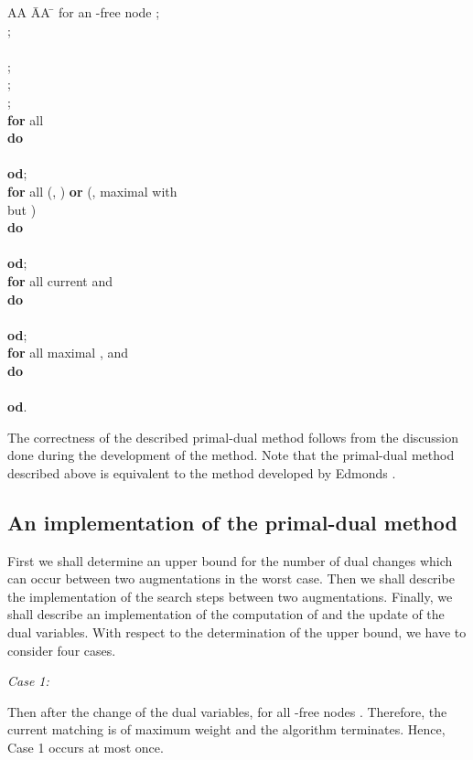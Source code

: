 \documentclass[12pt,twoside,a4paper]{article}
\begin{document}
\begin{tabbing}
AA \= AA \= \kill
 for an -free node ; \\
;\\
   \\
 ; \\
; \\
; \\
{\bf for} all  \\
\> {\bf do} \\
\> \>  \\
\> {\bf od}; \\ 
{\bf for} all (, ) {\bf or} (,  
maximal with \\
\> \> \qquad \qquad \qquad \qquad \qquad \qquad  but ) \\
\> {\bf do} \\
\> \>  \\
\> {\bf od}; \\ 
{\bf for} all current  and  \\
\> {\bf do} \\
\> \>  \\
\> {\bf od}; \\
{\bf for} all maximal ,  and  \\
\> {\bf do} \\
\> \>  \\
\> {\bf od}.
\end{tabbing}

The correctness of the described primal-dual method follows from the 
discussion done during the development of the method. Note that the primal-dual method described 
above is equivalent to the method developed by Edmonds \cite{Ed2}.

\subsection{An implementation of the primal-dual method}

First we shall determine an upper bound for the number of dual changes which can occur between 
two augmentations in the worst case. Then we shall describe the implementation of the search
steps between two augmentations. Finally, we shall describe an implementation of the
computation of  and the update of the dual variables. With respect to the determination
of the upper bound, we have to consider four cases.

\medskip
\noindent
{\em Case 1:\/} 

\medskip
Then after the change of the dual variables,  for all -free nodes
. Therefore, the current matching  is of maximum weight and the 
algorithm terminates. Hence, Case 1 occurs at most once.
\end{document}
